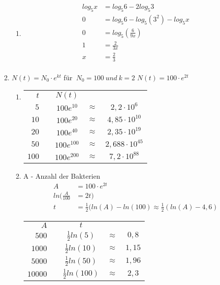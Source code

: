 \begin{enumerate}
\begin{enumerate}
  \item
  \begin{align*} 
  log_5 x&=log_5 6-2log_5 3 \\
  0 &=log_5 6 -log_5 (3^2) - log_5 x \\
  0 &= log_5(\frac{6}{9x})\\
  1 &= \frac{2}{3x}\\
  x &= \frac{2}{3}\\
  \end{align*} 

  \end{enumerate}
  
  
  \item %
  $N(t)=N_0 \cdot e^{kt}$ \newline
  f\"ur $\ N_0=100 \ und \ k=2 $\newline
  $N(t)=100\cdot e^{2t}$ \newline
  \begin{enumerate}
	\item 
	\begin{tabular}{rcccc}
	$t$ & & $ N(t)$ & & \\
	$5$ & & $100e^{10}$ & $\approx$ & $2,2 \cdot10^6$\\
	$10$ & & $100e^{20}$ & $\approx$ & $4,85 \cdot10^{10}$\\
	$20$ & & $100e^{40}$ & $\approx$ & $2,35 \cdot10^{19}$\\
	$50$ & & $100e^{100}$ & $\approx$ & $2,688 \cdot10^{45}$\\
	$100$ & & $100e^{200}$ & $\approx$ & $7,2 \cdot10^{88}$\\
	\end{tabular}
	
	
	\item
	A - Anzahl der Bakterien \newline
	\begin{align*}
	A &= 100 \cdot e^{2t}\\
	ln(\frac{A}{100}&=2t)\\
	t&= \frac{1}{2}(ln(A)- ln(100) \approx \frac{1}{2}(ln(A)-4,6)
	\end{align*}
	\begin{tabular}{rcccc}
	$A$ & & $ t$ & & \\
	$500$ & & $\frac{1}{2} ln(5)$ & $\approx$ & $0,8$\\
	$1000$ & & $\frac{1}{2} ln(10)$ & $\approx$ & $1,15$\\
	$5000$ & & $\frac{1}{2} ln(50)$ & $\approx$ & $1,96$\\
	$10000$ & & $\frac{1}{2} ln(100)$ & $\approx$ & $2,3$\\
	\end{tabular}
		\end{enumerate}



\end{enumerate}
